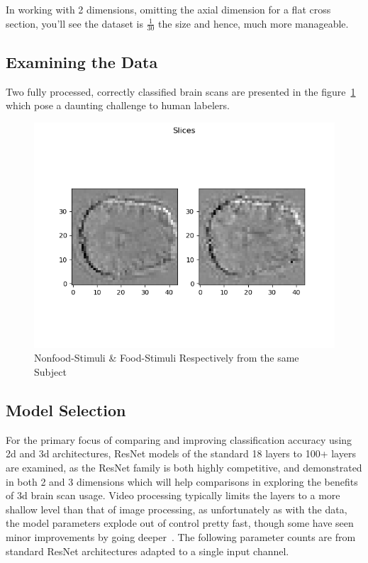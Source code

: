 In working with 2 dimensions, omitting the axial dimension for a flat cross section, you'll see the dataset is
$\frac{1}{30}$ the size and hence, much more manageable.


\subsection{Examining the Data}\label{subsec:examining-data}

Two fully processed, correctly classified brain scans are presented in the figure~\ref{fig:comparison}
which pose a daunting challenge to human labelers.

\begin{figure}
  \includegraphics[width=\linewidth]{images/nf_f_hard_comparison.png}
  \caption{Nonfood-Stimuli \& Food-Stimuli Respectively from the same Subject}
  \label{fig:comparison}
\end{figure}

\subsection{Model Selection}\label{subsec:model-selection}

For the primary focus of comparing and improving classification accuracy using 2d and 3d architectures, ResNet models
of the standard 18 layers to 100+ layers are examined, as the ResNet family is both highly competitive, and demonstrated
in both 2 and 3 dimensions which will help comparisons in exploring the benefits of 3d brain scan usage.
Video processing typically limits the layers to a more shallow level than that of image processing, as unfortunately as
with the data, the model parameters explode out of control pretty fast, though some have seen minor improvements by
going deeper~\cite{hara3dcnns}.
The following parameter counts are from standard ResNet architectures adapted to a single input channel.


